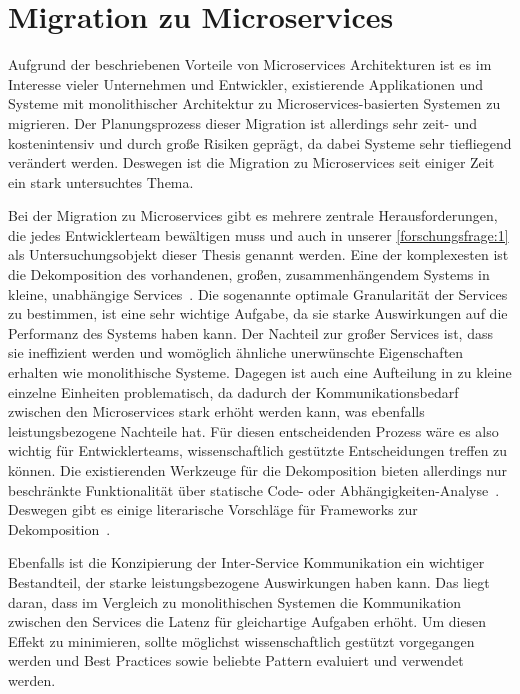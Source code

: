 \section{Migration zu Microservices}

Aufgrund der beschriebenen Vorteile von Microservices Architekturen ist es im Interesse vieler Unternehmen und Entwickler, existierende Applikationen und Systeme mit monolithischer Architektur zu Microservices-basierten Systemen zu migrieren.
Der Planungsprozess dieser Migration ist allerdings sehr zeit- und kostenintensiv und durch große Risiken geprägt, da dabei Systeme sehr tiefliegend verändert werden.
Deswegen ist die Migration zu Microservices seit einiger Zeit ein stark untersuchtes Thema.

Bei der Migration zu Microservices gibt es mehrere zentrale Herausforderungen, die jedes Entwicklerteam bewältigen muss und auch in unserer \cref{forschungsfrage:1} als Untersuchungsobjekt dieser Thesis genannt werden.
Eine der komplexesten ist die Dekomposition des vorhandenen, großen, zusammenhängendem Systems in kleine, unabhängige Services~\cite{a-survey-on,taibi2017processmotivations,taibi2019decomposition}.
Die sogenannte optimale Granularität der Services zu bestimmen, ist eine sehr wichtige Aufgabe, da sie starke Auswirkungen auf die Performanz des Systems haben kann.
Der Nachteil zur großer Services ist, dass sie ineffizient werden und womöglich ähnliche unerwünschte Eigenschaften erhalten wie monolithische Systeme.
Dagegen ist auch eine Aufteilung in zu kleine einzelne Einheiten problematisch, da dadurch der Kommunikationsbedarf zwischen den Microservices stark erhöht werden kann, was ebenfalls leistungsbezogene Nachteile hat.
Für diesen entscheidenden Prozess wäre es also wichtig für Entwicklerteams, wissenschaftlich gestützte Entscheidungen treffen zu können.
Die existierenden Werkzeuge für die Dekomposition bieten allerdings nur beschränkte Funktionalität über statische Code- oder Abhängigkeiten-Analyse~\cite{a-survey-on}.
Deswegen gibt es einige literarische Vorschläge für Frameworks zur Dekomposition~\cite{taibi2019decomposition,taibi2019monolithic}.

Ebenfalls ist die Konzipierung der Inter-Service Kommunikation ein wichtiger Bestandteil, der starke leistungsbezogene Auswirkungen haben kann.
Das liegt daran, dass im Vergleich zu monolithischen Systemen die Kommunikation zwischen den Services die Latenz für gleichartige Aufgaben erhöht.
Um diesen Effekt zu minimieren, sollte möglichst wissenschaftlich gestützt vorgegangen werden und Best Practices sowie beliebte Pattern evaluiert und verwendet werden.

